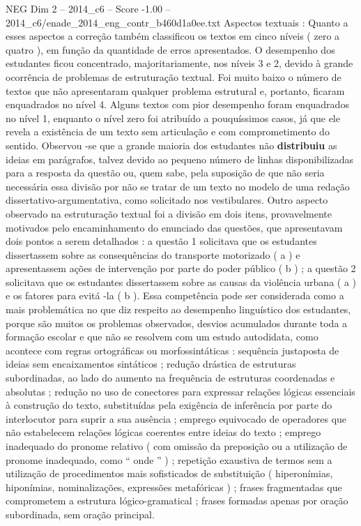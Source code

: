 \begin{textsample}{NEG Dim 2 – 2014\_c6 – Score -1.00 – 2014\_c6/enade\_2014\_eng\_contr\_b460d1a0ee.txt}
Aspectos textuais : Quanto a esses aspectos a correção também classificou os textos em cinco níveis ( zero a quatro ), em função da quantidade de erros apresentados.
O desempenho dos estudantes ficou concentrado, majoritariamente, nos níveis 3 e 2, devido à grande ocorrência de problemas de estruturação textual.
Foi muito baixo o número de textos que não apresentaram qualquer problema estrutural e, portanto, ficaram enquadrados no nível 4.
Alguns textos com pior desempenho foram enquadrados no nível 1, enquanto o nível zero foi atribuído a pouquíssimos casos, já que ele revela a existência de um texto sem articulação e com comprometimento do sentido.
Observou -se que a grande maioria dos estudantes não \textbf{distribuiu} as ideias em parágrafos, talvez devido ao pequeno número de linhas disponibilizadas para a resposta da questão ou, quem sabe, pela suposição de que não seria necessária essa divisão por não se tratar de um texto no modelo de uma redação dissertativo-argumentativa, como solicitado nos vestibulares.
Outro aspecto observado na estruturação textual foi a divisão em dois itens, provavelmente motivados pelo encaminhamento do enunciado das questões, que apresentavam dois pontos a serem detalhados : a questão 1 solicitava que os estudantes dissertassem sobre as consequências do transporte motorizado ( a ) e apresentassem ações de intervenção por parte do poder público ( b ) ; a questão 2 solicitava que os estudantes dissertassem sobre as causas da violência urbana ( a ) e os fatores para evitá -la ( b ).
Essa competência pode ser considerada como a mais problemática no que diz respeito ao desempenho linguístico dos estudantes, porque são muitos os problemas observados, desvios acumulados durante toda a formação escolar e que não se resolvem com um estudo autodidata, como acontece com regras ortográficas ou morfossintáticas : sequência justaposta de ideias sem encaixamentos sintáticos ; redução drástica de estruturas subordinadas, ao lado do aumento na frequência de estruturas coordenadas e absolutas ; redução no uso de conectores para expressar relações lógicas essenciais à construção do texto, substituídas pela exigência de inferência por parte do interlocutor para suprir a sua ausência ; emprego equivocado de operadores que não estabelecem relações lógicas coerentes entre ideias do texto ; emprego inadequado do pronome relativo ( com omissão da preposição ou a utilização de pronome inadequado, como “ onde ” ) ; repetição exaustiva de termos sem a utilização de procedimentos mais sofisticados de substituição ( hiperonímias, hiponímias, nominalizações, expressões metafóricas ) ; frases fragmentadas que comprometem a estrutura lógico-gramatical ; frases formadas apenas por oração subordinada, sem oração principal.

\end{textsample}
